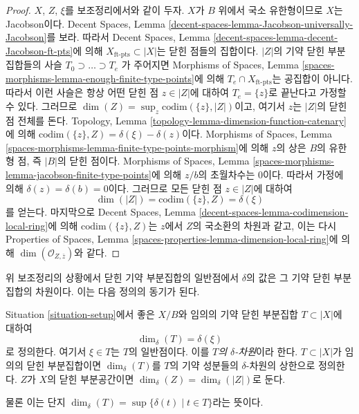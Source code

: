 \begin{proof}
$X$, $Z$, $\xi$를 보조정리에서와 같이 두자.
$X$가 $B$ 위에서 국소 유한형이므로 $X$는 Jacobson이다. Decent Spaces,
Lemma \ref{decent-spaces-lemma-Jacobson-universally-Jacobson}를 보라.
따라서 Decent Spaces, Lemma
\ref{decent-spaces-lemma-decent-Jacobson-ft-pts}에 의해
$X_{\text{ft-pts}} \subset |X|$는 닫힌 점들의 집합이다.
$|Z|$의 기약 닫힌 부분집합들의 사슬
$T_0 \supset \ldots \supset T_e$
가 주어지면 Morphisms of Spaces, Lemma
\ref{spaces-morphisms-lemma-enough-finite-type-points}에 의해
$T_e \cap X_{\text{ft-pts}}$는 공집합이 아니다.
따라서 이런 사슬은 항상 어떤 닫힌 점 $z \in |Z|$에 대하여
$T_e = \{z\}$로 끝난다고 가정할 수 있다. 그러므로
$\dim(Z) = \sup_z \text{codim}(\{z\}, |Z|)$이고, 여기서 $z$는
$|Z|$의 닫힌 점 전체를 돈다. Topology, Lemma
\ref{topology-lemma-dimension-function-catenary}에 의해
$\text{codim}(\{z\}, Z) = \delta(\xi) - \delta(z)$이다.
Morphisms of Spaces, Lemma
\ref{spaces-morphisms-lemma-finite-type-points-morphism}에 의해 $z$의 상은
$B$의 유한형 점, 즉 $|B|$의 닫힌 점이다. Morphisms of Spaces, Lemma
\ref{spaces-morphisms-lemma-jacobson-finite-type-points}에 의해 $z/b$의
초월차수는 $0$이다. 따라서 가정에 의해
$\delta(z) = \delta(b) = 0$이다. 그러므로 모든 닫힌 점
$z \in |Z|$에 대하여
$$
\dim(|Z|) = \text{codim}(\{z\}, Z) = \delta(\xi)
$$
를 얻는다. 마지막으로 Decent Spaces, Lemma
\ref{decent-spaces-lemma-codimension-local-ring}에 의해
$\text{codim}(\{z\}, Z)$는 $z$에서 $Z$의 국소환의 차원과 같고,
이는 다시 Properties of Spaces, Lemma
\ref{spaces-properties-lemma-dimension-local-ring}에 의해
$\dim(\mathcal{O}_{Z, \overline{z}})$와 같다.
\end{proof}

\noindent
위 보조정리의 상황에서 닫힌 기약 부분집합의 일반점에서 $\delta$의 값은
그 기약 닫힌 부분집합의 차원이다. 이는 다음 정의의 동기가 된다.

\begin{definition}
\label{definition-delta-dimension}
Situation \ref{situation-setup}에서 좋은 $X/B$와 임의의 기약 닫힌 부분집합
$T \subset |X|$에 대하여
$$
\dim_\delta(T) = \delta(\xi)
$$
로 정의한다. 여기서 $\xi \in T$는 $T$의 일반점이다. 이를
{\it $T$의 $\delta$-차원}이라 한다. $T \subset |X|$가 임의의 닫힌
부분집합이면 $\dim_\delta(T)$를 $T$의 기약 성분들의 $\delta$-차원의
상한으로 정의한다. $Z$가 $X$의 닫힌 부분공간이면
$\dim_\delta(Z) = \dim_\delta(|Z|)$로 둔다.
\end{definition}

\noindent
물론 이는 단지
$\dim_\delta(T) = \sup \{\delta(t) \mid t \in T\}$라는 뜻이다.






